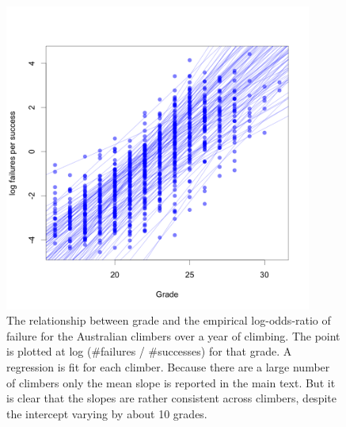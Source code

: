 \documentclass[11pt]{article}
\begin{document}
\begin{figure}
\centering
\includegraphics[width=0.9\textwidth]{../results/aus/ascents-from-2016-08-01-to-2021-08-01-minAscents30-minFails1-Sport-AU-session-regression.png}
\caption{\small The relationship between grade and the empirical log-odds-ratio of failure for the Australian climbers over a year of climbing. The point is plotted at log (\#failures / \#successes) for that grade. A regression is fit for each climber. Because there are a large number of climbers only the mean slope is reported in the main text. But it is clear that the slopes are rather consistent across climbers, despite the intercept varying by about 10 grades.}
\label{fig1}
\end{figure}
\end{document}
